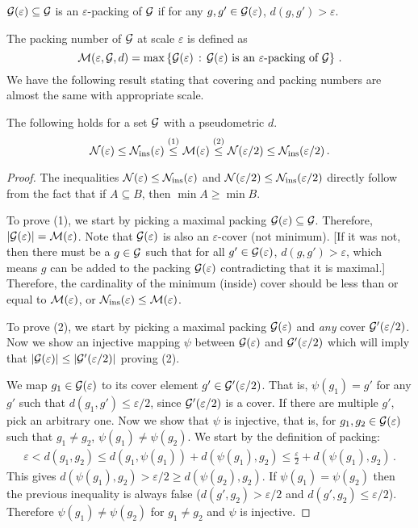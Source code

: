 \documentclass[twoside]{article}
\newcommand{\set}[1]{\left\{#1\right\}}
\begin{document}
\begin{definition}[Packing]
    $\mathcal{G}(\varepsilon) \subseteq \mathcal{G}$ is an $\varepsilon$-packing of $\mathcal{G}$ if for any $g, g' \in \mathcal{G}(\varepsilon)$, $d(g, g') > \varepsilon$.
\end{definition}
The packing number of $\mathcal{G}$ at scale $\varepsilon$ is defined as
\[
    \cM(\varepsilon, \cG, d) = \max\set{\cG(\varepsilon) \,:\, \text{$\cG(\varepsilon)$ is an $\varepsilon$-packing of $\cG$}} \,.
\]
We have the following result stating that covering and packing numbers are almost the same with appropriate scale.

\begin{proposition}\label{prop:cover-pack}
    The following holds for a set $\mathcal{G}$ with a pseudometric $d$.
    \[
    \mathcal{N}(\varepsilon) \le \mathcal{N}_{\text{ins}}(\varepsilon) \stackrel{(1)}{\le} \mathcal{M}(\varepsilon) \stackrel{(2)}{\le} \mathcal{N}(\varepsilon/2) \le \mathcal{N}_{\text{ins}}(\varepsilon/2) \,.
    \]
\end{proposition}
\begin{proof}
The inequalities $\mathcal{N}(\varepsilon) \le \mathcal{N}_{\text{ins}}(\varepsilon)$ and $\mathcal{N}(\varepsilon/2) \le \mathcal{N}_{\text{ins}}(\varepsilon/2)$ directly follow from the fact that if $A \subseteq B$, then $\min A \ge \min B$.

To prove (1), we start by picking a maximal packing $\mathcal{G}(\varepsilon) \subseteq \mathcal{G}$. Therefore, $|\mathcal{G}(\varepsilon)| = \mathcal{M}(\varepsilon)$. Note that $\mathcal{G}(\varepsilon)$ is also an $\varepsilon$-cover (not minimum). [If it was not, then there must be a $g \in \mathcal{G}$ such that for all $g' \in \mathcal{G}(\varepsilon)$, $d(g, g') > \varepsilon$, which means $g$ can be added to the packing $\mathcal{G}(\varepsilon)$ contradicting that it is maximal.] Therefore, the cardinality of the minimum (inside) cover should be less than or equal to $\mathcal{M}(\varepsilon)$, or $\mathcal{N}_{\text{ins}}(\varepsilon) \le \mathcal{M}(\varepsilon)$.


To prove (2), we start by picking a maximal packing $\mathcal{G}(\varepsilon)$ and \emph{any} cover $\mathcal{G}'(\varepsilon/2)$. Now we show an injective mapping $\psi$ between $\mathcal{G}(\varepsilon)$ and $\mathcal{G}'(\varepsilon/2)$ which will imply that $|\mathcal{G}(\varepsilon)| \le |\mathcal{G}'(\varepsilon/2)|$ proving (2).

We map $g_1 \in \mathcal{G}(\varepsilon)$ to its cover element $g' \in \mathcal{G}'(\varepsilon/2)$. That is, $\psi(g_1) = g'$ for any $g'$ such that $d(g_1, g') \le \varepsilon/2$, since $\mathcal{G}'(\varepsilon/2)$ is a cover. If there are multiple $g'$, pick an arbitrary one. Now we show that $\psi$ is injective, that is, for $g_1, g_2 \in \mathcal{G}(\varepsilon)$ such that $g_1 \ne g_2$, $\psi(g_1) \ne \psi(g_2)$. We start by the definition of packing:
\begin{align*}
    \varepsilon < d(g_1, g_2) \le d(g_1, \psi(g_1)) + d(\psi(g_1), g_2) \le \frac\varepsilon2 + d(\psi(g_1), g_2)\,.
\end{align*}
This gives $d(\psi(g_1), g_2) > \varepsilon/2 \ge d(\psi(g_2), g_2)$. If $\psi(g_1) = \psi(g_2)$ then the previous inequality is always false ($d(g', g_2) > \varepsilon/2$ and $d(g', g_2) \le \varepsilon/2$). Therefore $\psi(g_1) \ne \psi(g_2)$ for $g_1 \ne g_2$ and $\psi$ is injective.
\end{proof}
\end{document}
